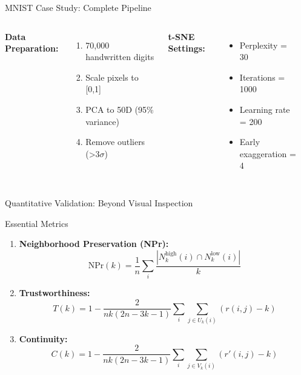 \begin{frame}{MNIST Case Study: Complete Pipeline}
\begin{columns}
\textbf{Data Preparation:}
\begin{enumerate}
\item 70,000 handwritten digits
\item Scale pixels to [0,1]
\item PCA to 50D (95\% variance)
\item Remove outliers (>3$\sigma$)
\end{enumerate}

\textbf{t-SNE Settings:}
\begin{itemize}
\item Perplexity = 30
\item Iterations = 1000
\item Learning rate = 200
\item Early exaggeration = 4
\end{itemize}

\begin{center}
\end{center}
\end{columns}

\vspace{0.3cm}
\end{frame}

\begin{frame}{Quantitative Validation: Beyond Visual Inspection}
\begin{block}{Essential Metrics}
\begin{enumerate}
\item \textbf{Neighborhood Preservation (NPr):}
$$\text{NPr}(k) = \frac{1}{n}\sum_i \frac{|N_k^{\text{high}}(i) \cap N_k^{\text{low}}(i)|}{k}$$

\item \textbf{Trustworthiness:}
$$T(k) = 1 - \frac{2}{nk(2n-3k-1)}\sum_i \sum_{j \in U_k(i)} (r(i,j) - k)$$

\item \textbf{Continuity:}
$$C(k) = 1 - \frac{2}{nk(2n-3k-1)}\sum_i \sum_{j \in V_k(i)} (r'(i,j) - k)$$
  \end{enumerate}
\end{block}

\end{frame}

